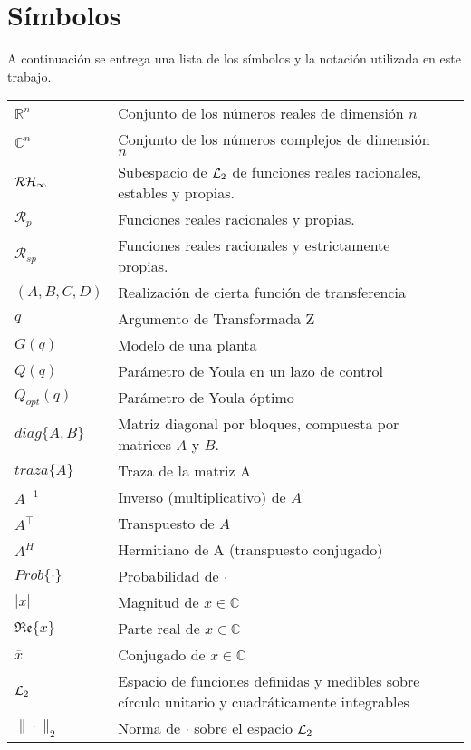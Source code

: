 \section{S\'imbolos}
A continuaci\'on se entrega una lista de los s\'imbolos y la notaci\'on utilizada en este trabajo. 

\vspace{0.5cm}
\begin{tabular}{l p{10cm} l}
$\mathbb{R}^n$ & Conjunto de los n\'umeros reales de dimensi\'on $n$\\
$\mathbb{C}^n$ & Conjunto de los n\'umeros complejos de dimensi\'on $n$\\
${\mathcal R}{\mathcal H}_\infty$ & Subespacio de $\mathcal {L}_2$ de funciones reales racionales, estables y propias.\\
$\mathcal{R}_{p}$ & Funciones reales racionales y propias.\\
$\mathcal{R}_{sp}$ & Funciones reales racionales y estrictamente propias.\\
$(A,B,C,D)$ & Realizaci\'on de cierta funci\'on de transferencia\\
$q$ & Argumento de Transformada Z\\
$G(q)$ & Modelo de una planta\\
$Q(q)$ & Par\'ametro de Youla en un lazo de control\\
$Q_{opt}(q)$ & Par\'ametro de Youla \'optimo\\
$diag\{A,B\}$ & Matriz diagonal por bloques, compuesta por matrices $A$ y $B$.\\
$traza\{A\}$ & Traza de la matriz A\\
$A^{-1}$ & Inverso (multiplicativo) de $A$\\
$A^{\intercal}$ & Transpuesto de $A$\\
$A^H$ & Hermitiano de A (transpuesto conjugado)\\
$Prob\{\cdot\}$ & Probabilidad de $\cdot$\\
$|x|$ & Magnitud de $x \in \mathbb{C}$\\
$\mathfrak{Re}\{x\}$ & Parte real de $x \in \mathbb{C}$\\
$\overline{x}$ & Conjugado de $x \in \mathbb{C}$\\
$\mathcal {L}_2$ & Espacio de funciones definidas y medibles sobre c\'irculo unitario y cuadr\'aticamente integrables\\
$\|\cdot\|_{2}$ & Norma de $\cdot$ sobre el espacio $\mathcal {L}_2$
\end{tabular}

